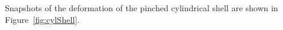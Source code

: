     Snapshots of the deformation of the pinched cylindrical shell are shown in 
    Figure~\ref{fig:cylShell}.
    \begin{figure}[htpb!]
      \begin{center}
\end{center}
\end{figure}
